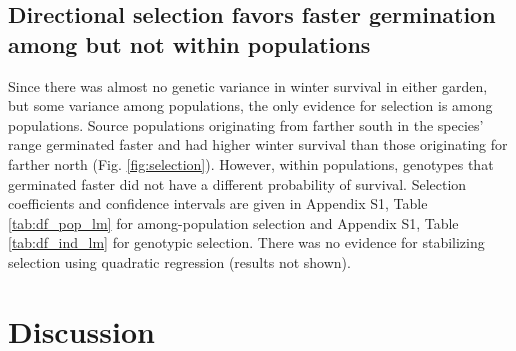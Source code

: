 \documentclass[
  12pt,
]{article}
\begin{document}
\hypertarget{directional-selection-favors-faster-germination-among-but-not-within-populations}{%
\subsection{Directional selection favors faster germination among but not within populations}\label{directional-selection-favors-faster-germination-among-but-not-within-populations}}

Since there was almost no genetic variance in winter survival in either garden, but some variance among populations, the only evidence for selection is among populations. Source populations originating from farther south in the species' range germinated faster and had higher winter survival than those originating for farther north (Fig. \ref{fig:selection}). However, within populations, genotypes that germinated faster did not have a different probability of survival. Selection coefficients and confidence intervals are given in Appendix S1, Table \ref{tab:df_pop_lm} for among-population selection and Appendix S1, Table \ref{tab:df_ind_lm} for genotypic selection. There was no evidence for stabilizing selection using quadratic regression (results not shown).

\hypertarget{discussion}{%
\section{Discussion}\label{discussion}}
\end{document}
